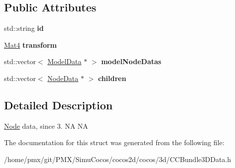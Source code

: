 \subsection*{Public Attributes}
\begin{DoxyCompactItemize}
\item 
\mbox{\label{structNodeData_a8952517f94652636d7298f5cfc0656b4}} 
std\+::string {\bfseries id}
\item 
\mbox{\label{structNodeData_aca2a28d84c9b43524335d5091cb60a88}} 
\hyperlink{classMat4}{Mat4} {\bfseries transform}
\item 
\mbox{\label{structNodeData_aa86210fb678280fee1ba5c8268764e8a}} 
std\+::vector$<$ \hyperlink{structModelData}{Model\+Data} $\ast$ $>$ {\bfseries model\+Node\+Datas}
\item 
\mbox{\label{structNodeData_ad194208772b9d0caa82a49417cc3e446}} 
std\+::vector$<$ \hyperlink{structNodeData}{Node\+Data} $\ast$ $>$ {\bfseries children}
\end{DoxyCompactItemize}


\subsection{Detailed Description}
\hyperlink{classNode}{Node} data, since 3.  NA  NA 

The documentation for this struct was generated from the following file\+:\begin{DoxyCompactItemize}
\item 
/home/pmx/git/\+P\+M\+X/\+Simu\+Cocos/cocos2d/cocos/3d/C\+C\+Bundle3\+D\+Data.\+h\end{DoxyCompactItemize}
